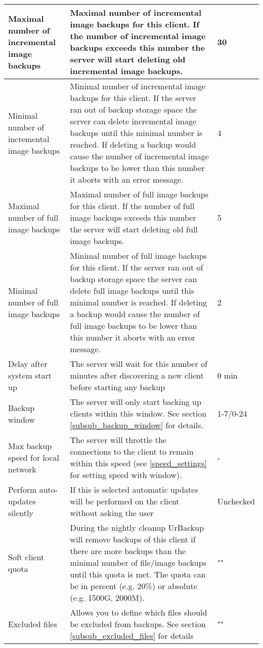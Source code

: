 \documentclass[a4paper,10pt]{article}
\begin{document}
\begin{longtable}{|p{}|p{}|p{}|}
\hline
Maximal number of incremental image backups & Maximal number of incremental image backups for this client. If the number of incremental image backups exceeds this number the server will start deleting old incremental image backups. & 30\\
\hline
Minimal number of incremental image backups & Minimal number of incremental image backups for this client. If the server ran out of backup storage space the server can delete incremental image backups until this minimal number is reached. If deleting a backup would cause the number of incremental image backups to be lower than this number it aborts with an error message. & 4\\
\hline
Maximal number of full image backups & Maximal number of full image backups for this client. If the number of
 full image backups exceeds this number the server will start deleting old full image backups. & 5\\
\hline
Minimal number of full image backups & Minimal number of full image backups for this client. If the server ran out of backup storage space the server can delete full image backups until this minimal number is reached. If deleting a backup would cause the number of full image backups to be lower than this number it aborts with an error message. & 2\\
\hline
Delay after system start up & The server will wait for this number of minutes after discovering a new client before starting any backup & 0 min\\
\hline
Backup window & The server will only start backing up clients within this window. See section \ref{subsub_backup_window} for details. & 1-7/0-24\\
\hline
Max backup speed for local network & The server will throttle the connections to the client to remain within this speed (see \ref{speed_settings} for setting speed with window). & -\\
\hline
Perform auto-updates silently & If this is selected automatic updates will be performed on the client without asking the user & Unchecked\\
\hline
Soft client quota & During the nightly cleanup UrBackup will remove backups of this client
if there are more backups than the minimal number of file/image backups until this quota is met. The quota can be in percent (e.g. 20\%) or
absolute (e.g. 1500G, 2000M). & "" \\
\hline
Excluded files & Allows you to define which files should be excluded from backups. See section \ref{subsub_excluded_files} for details & "" \\

\end{longtable}
\end{document}

